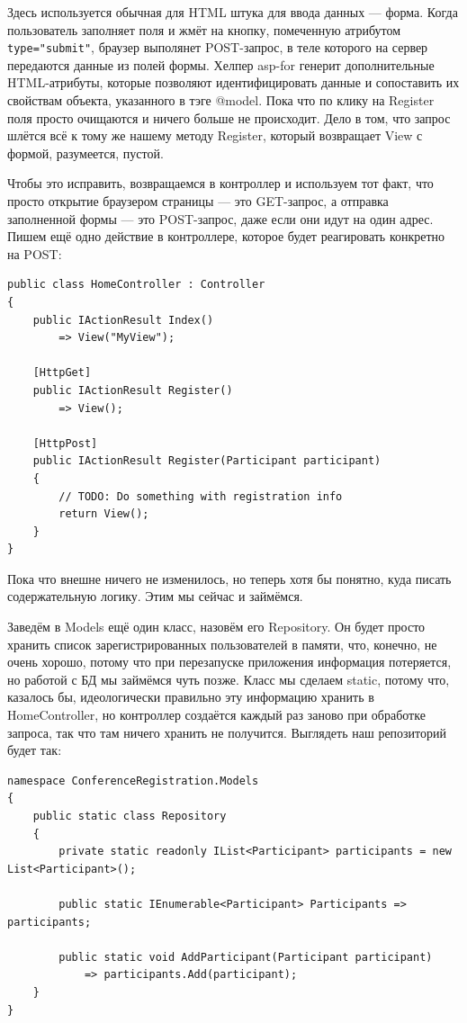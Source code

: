 \documentclass[a5paper]{article}
\begin{document}
Здесь используется обычная для HTML штука для ввода данных --- форма. Когда пользователь заполняет поля и жмёт на кнопку, помеченную атрибутом \verb|type="submit"|, браузер выполянет POST-запрос, в теле которого на сервер передаются данные из полей формы. Хелпер asp-for генерит дополнительные
HTML-атрибуты, которые позволяют идентифицировать данные и сопоставить их свойствам объекта, указанного в тэге @model. Пока что по клику на Register поля просто очищаются и ничего больше не происходит. 
Дело в том, что запрос шлётся всё к тому же нашему методу Register, который возвращает View с формой, разумеется, пустой.

Чтобы это исправить, возвращаемся в контроллер и используем тот факт, что просто открытие браузером страницы --- это GET-запрос, а отправка заполненной формы --- это POST-запрос, даже если они идут на один адрес. Пишем ещё одно действие в контроллере, которое будет реагировать конкретно
на POST:

\begin{verbatim}
public class HomeController : Controller
{
    public IActionResult Index()
        => View("MyView");

    [HttpGet]
    public IActionResult Register()
        => View();

    [HttpPost]
    public IActionResult Register(Participant participant)
    {
        // TODO: Do something with registration info
        return View();
    }
}
\end{verbatim}

Пока что внешне ничего не изменилось, но теперь хотя бы понятно, куда писать содержательную логику. Этим мы сейчас и займёмся. 

Заведём в Models ещё один класс, назовём его Repository. Он будет просто хранить список зарегистрированных пользователей в памяти, что, конечно, не очень хорошо, потому что при перезапуске приложения информация потеряется, но работой с БД мы займёмся чуть позже.
Класс мы сделаем static, потому что, казалось бы, идеологически правильно эту информацию хранить в HomeController, но контроллер создаётся каждый раз заново при обработке запроса, так что там ничего хранить не получится.
Выглядеть наш репозиторий будет так:

\begin{verbatim}
namespace ConferenceRegistration.Models
{
    public static class Repository
    {
        private static readonly IList<Participant> participants = new List<Participant>();

        public static IEnumerable<Participant> Participants => participants;

        public static void AddParticipant(Participant participant) 
            => participants.Add(participant);
    }
}
\end{verbatim}
\end{document}
